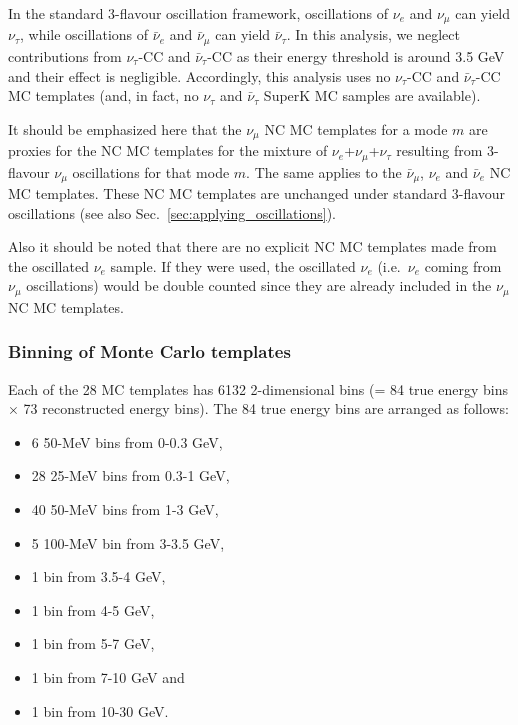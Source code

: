 In the standard 3-flavour oscillation framework,
oscillations of $\nu_{e}$ and $\nu_{\mu}$ can yield $\nu_{\tau}$, while
oscillations of $\bar{\nu}_{e}$ and $\bar{\nu}_{\mu}$ can yield $\bar{\nu}_{\tau}$.
In this analysis, we neglect contributions from $\nu_{\tau}$-CC and $\bar{\nu}_{\tau}$-CC as their
energy threshold is around 3.5 GeV and their effect is negligible.
Accordingly, this analysis uses no $\nu_{\tau}$-CC and $\bar{\nu}_{\tau}$-CC MC templates
(and, in fact, no $\nu_{\tau}$ and $\bar{\nu}_{\tau}$ SuperK MC samples are available).

It should be emphasized here that
the $\nu_{\mu}$ NC MC templates for a mode $m$ are proxies for the
NC MC templates for the mixture of $\nu_{e}$+$\nu_{\mu}$+$\nu_{\tau}$ resulting from 
3-flavour $\nu_{\mu}$ oscillations for that mode $m$. The same applies to the $\bar{\nu}_{\mu}$, $\nu_{e}$ and $\bar{\nu}_{e}$ NC MC templates.
These NC MC templates are unchanged under standard 3-flavour oscillations (see also Sec.\ \ref{sec:applying_oscillations}).

Also it should be noted that there are no explicit NC MC templates made from the oscillated $\nu_{e}$ sample.
If they were used, the oscillated $\nu_{e}$ (i.e.\ $\nu_{e}$ coming from $\nu_{\mu}$ oscillations) would be double counted 
since they are already included in the $\nu_{\mu}$ NC MC templates.

\subsubsection {Binning of Monte Carlo templates}
\label{sec:mc_templates:template_binning}

Each of the 28 MC templates has 6132 2-dimensional bins (= 84 true energy bins $\times$ 73 reconstructed energy bins).
The 84 true energy bins are arranged as follows:
\begin{itemize}
 \item   6 50-MeV bins from 0-0.3 GeV, 
 \item   28 25-MeV bins from 0.3-1 GeV, 
 \item   40 50-MeV bins from 1-3 GeV, 
 \item   5 100-MeV bin from 3-3.5 GeV, 
 \item   1 bin from 3.5-4 GeV, 
 \item   1 bin from 4-5 GeV, 
 \item   1 bin from 5-7 GeV, 
 \item   1 bin from 7-10 GeV and
 \item   1 bin from 10-30 GeV.
\end{itemize}

